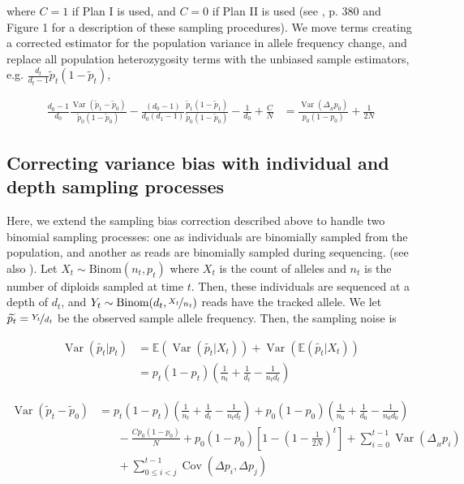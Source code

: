\documentclass[11pt]{article}
\newcommand{\E}{\mathbb{E}}
\DeclareMathOperator{\var}{Var}
\DeclareMathOperator{\cov}{Cov}
\begin{document}
where $C = 1$ if Plan I is used, and $C=0$ if Plan II is used (see
\cite{Waples1989-sj}, p. 380 and Figure 1 for a description of these sampling
procedures). We move terms creating a corrected estimator for the population
variance in allele frequency change, and replace all population heterozygosity
terms with the unbiased sample estimators, e.g. $\frac{d_t}{d_t-1}
\widetilde{p}_t (1- \widetilde{p}_t)$,

\begin{align}
  \label{supp:eqn-depth-only-correction}
  \frac{d_0-1}{d_0} \frac{\var(\widetilde{p}_1 - \widetilde{p}_0)}{\widetilde{p}_0(1-\widetilde{p}_0)} - \frac{(d_0-1)}{d_0 (d_1 - 1)} \frac{\widetilde{p}_1(1-\widetilde{p}_1)}{\widetilde{p}_0(1-\widetilde{p}_0)} - \frac{1}{d_0} + \frac{C}{N}  &= \frac{\var(\Delta_{_H} p_0)}{p_0(1-p_0)} + \frac{1}{2N} 
\end{align}

\subsection{Correcting variance bias with individual and depth sampling processes}
\label{supp:ind-depth-var-corr}

Here, we extend the sampling bias correction described above to handle two
binomial sampling processes: one as individuals are binomially sampled from the
population, and another as reads are binomially sampled during sequencing.
(see also \cite{Jonas2016-ia}). Let $X_t \sim \text{Binom}(n_t, p_t)$ where
$X_t$ is the count of alleles and $n_t$ is the number of diploids sampled at
time $t$. Then, these individuals are sequenced at a depth of $d_t$, and $Y_t
\sim \text{Binom}(d_t, \nicefrac{X_t}{n_t})$ reads have the tracked allele. We
let $\widetilde{p_t} = \nicefrac{Y_t}{d_t}$ be the observed sample allele
frequency. Then, the sampling noise is 

\begin{align}
  \var(\widetilde{p_t}|p_t) &= \E(\var(\widetilde{p_t} | X_t)) + \var(\E(\widetilde{p_t} | X_t)) \\
                            &= p_t(1-p_t) \left(\frac{1}{n_t} + \frac{1}{d_t} - \frac{1}{n_t d_t} \right)
\end{align}


\begin{align}
  \var(\widetilde{p}_t - \widetilde{p}_0) &= 
  p_t(1-p_t) \left(\frac{1}{n_t} + \frac{1}{d_t} - \frac{1}{n_t d_t} \right)  
  + p_0(1-p_0) \left( \frac{1}{n_0} + \frac{1}{d_0} - \frac{1}{n_0 d_0}\right)  \\ & \;\;\;\;\;\;
  - \frac{C p_0(1-p_0)}{N} + p_0(1-p_0) \left[1 - \left(1-\frac{1}{2N}\right)^t \right]+ \sum_{i=0}^{t-1} \var(\Delta_{_H} p_i)  \\ & \;\;\;\;\;\; + \sum_{0 \le i < j}^{t-1} \cov(\Delta p_i, \Delta p_j) 
\end{align}
\end{document}
